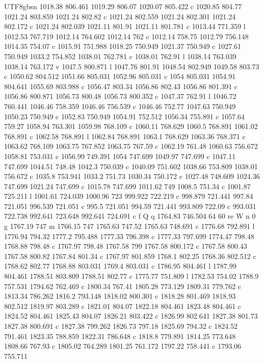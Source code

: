 \documentclass[11pt,a4paper,oneside]{report}
\begin{document}
\begin{CJK*}{UTF8}{gbsn}
{1018.38 806.461 1019.29 806.07 1020.07 805.422 c 1020.85 804.77 1021.24 803.859 1021.24 802.82 c 1021.24
802.559 1021.24 802.301 1021.24 802.172 c 1021.24 802.039 1021.11 801.91 1021.11 801.781 c 1013.44
771.359 l 1012.53 767.719 1012.14 764.602 1012.14 762 c 1012.14 758.75 1012.79 756.148 1014.35 754.07 c
1015.91 751.988 1018.25 750.949 1021.37 750.949 c 1027.61 750.949 1033.2 754.852 1038.01 762.781 c
1038.01 762.91 l 1038.14 763.039 1038.14 763.172 v 1047.5 800.871 l 1047.76 801.91 1048.54 802.949
1049.58 803.73 c 1050.62 804.512 1051.66 805.031 1052.96 805.031 c 1054 805.031 1054.91 804.641 1055.69
803.988 c 1056.47 803.34 1056.86 802.43 1056.86 801.391 c 1056.86 800.871 1056.73 800.48 1056.73 800.352
c 1047.37 762.91 l 1046.72 760.441 1046.46 758.359 1046.46 756.539 c 1046.46 752.77 1047.63 750.949
1050.23 750.949 c 1052.83 750.949 1054.91 752.512 1056.34 755.891 c 1057.64 759.27 1058.94 763.301
1059.98 768.109 c 1060.11 768.629 1060.5 768.891 1061.02 768.891 c 1062.58 768.891 l 1062.84 768.891
1063.1 768.629 1063.36 768.371 c 1063.62 768.109 1063.75 767.852 1063.75 767.59 c 1062.19 761.48 1060.63
756.672 1058.81 753.031 c 1056.99 749.391 1054 747.699 1049.97 747.699 c 1047.11 747.699 1044.51 748.48
1042.3 750.039 c 1040.09 751.602 1038.66 753.809 1038.01 756.672 c 1035.8 753.941 1033.2 751.73 1030.34
750.172 c 1027.48 748.609 1024.36 747.699 1021.24 747.699 c 1015.78 747.699 1011.62 749 1008.5 751.34 c
1001.87 725.211 l 1001.61 724.039 1000.96 723 999.922 722.219 c 998.879 721.441 997.84 721.051 996.539
721.051 c 995.5 721.051 994.59 721.441 993.809 722.09 c 993.031 722.738 992.641 723.648 992.641 724.691 c
f Q q 1764.83 746.504 64 60 re W n 0 g 1767.19 747 m 1766.15 747 1765.63 747.52 1765.63 748.691 c 1776.68
792.891 l 1776.94 794.32 1777.2 795.488 1777.33 796.398 c 1777.33 797.699 1774.47 798.48 1768.88 798.48 c
1767.97 798.48 1767.58 799 1767.58 800.172 c 1767.58 800.43 1767.58 800.82 1767.84 801.34 c 1767.97
801.859 1768.1 802.25 1768.36 802.512 c 1768.62 802.77 1768.88 803.031 1769.4 803.031 c 1786.95 804.461 l
1787.99 804.461 1788.51 803.809 1788.51 802.77 c 1775.77 751.809 l 1782.53 754.02 1788.9 757.531 1794.62
762.469 c 1800.34 767.41 1805.28 773.129 1809.31 779.762 c 1813.34 786.262 1816.2 793.148 1818.02 800.301
c 1818.28 801.469 1818.93 802.512 1819.97 803.289 c 1821.01 804.07 1822.18 804.461 1823.48 804.461 c
1824.52 804.461 1825.43 804.07 1826.21 803.422 c 1826.99 802.641 1827.38 801.73 1827.38 800.691 c 1827.38
799.262 1826.73 797.18 1825.69 794.32 c 1824.52 791.461 1823.35 788.859 1822.31 786.648 c 1818.8 779.891
1814.25 773.648 1808.66 767.93 c 1805.02 764.289 1801.25 761.172 1797.22 758.441 c 1793.06 755.711
}
\end{CJK*}
\end{document}
